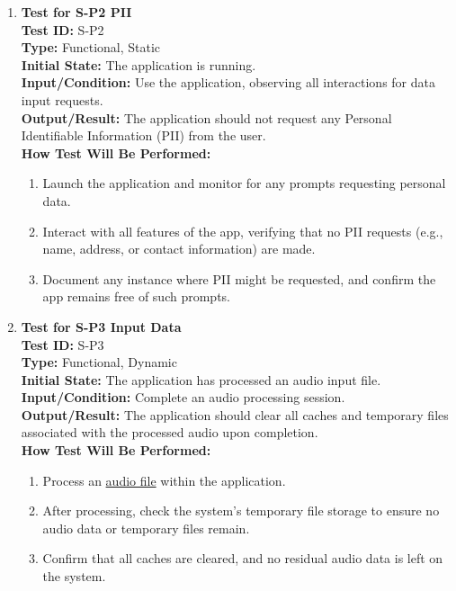 \documentclass[12pt, titlepage]{article}
\begin{document}
\begin{enumerate}
    \item \textbf{Test for S-P2 PII} \\
      \newline
      \textbf{Test ID:} S-P2 \\
      \textbf{Type:} Functional, Static \\
      \textbf{Initial State:} The application is running. \\
      \textbf{Input/Condition:} Use the application, observing all interactions for data input requests. \\
      \textbf{Output/Result:} The application should not request any Personal Identifiable Information (PII) from the user. \\
      \textbf{How Test Will Be Performed:}
      \begin{enumerate}
          \item Launch the application and monitor for any prompts requesting personal data.
          \item Interact with all features of the app, verifying that no PII requests (e.g., name, address, or contact 
          information) are made.
          \item Document any instance where PII might be requested, and confirm the app remains free of such prompts.
      \end{enumerate}

    \item \textbf{Test for S-P3 Input Data} \\
      \newline
      \textbf{Test ID:} S-P3 \\
      \textbf{Type:} Functional, Dynamic \\
      \textbf{Initial State:} The application has processed an audio input file. \\
      \textbf{Input/Condition:} Complete an audio processing session. \\
      \textbf{Output/Result:} The application should clear all caches and temporary files associated with the processed 
      audio upon completion. \\
      \textbf{How Test Will Be Performed:}
      \begin{enumerate}
          \item Process an \href{https://github.com/emilyperica/ScoreGen/tree/main/test/TestingDatasets/piano-samples}{audio file} 
          within the application.
          \item After processing, check the system’s temporary file storage to ensure no audio data or temporary files remain.
          \item Confirm that all caches are cleared, and no residual audio data is left on the system.
      \end{enumerate}
\end{enumerate}
\end{document}
